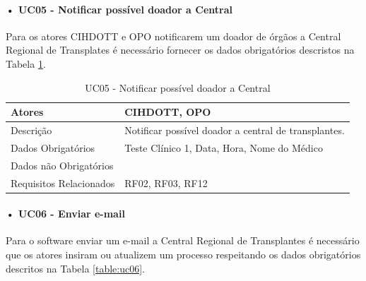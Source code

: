 \documentclass[portuguese,oneside]{tcc}
\begin{document}


\paragraph*{• UC05 - Notificar possível doador a Central}
Para os atores CIHDOTT e OPO notificarem um doador de órgãos a Central Regional de Transplates é necessário fornecer os dados obrigatórios descristos na Tabela \ref{table:uc05}. 

\begin{table}
\centering
\caption{UC05 - Notificar possível doador a Central} \label{table:uc05}
\begin{tabular}{ |p{5cm}|p{5cm}|  }

\hline
Atores & 
CIHDOTT, OPO\\

\hline
Descrição & 
 
Notificar possível doador a central de transplantes.
 \\

\hline
Dados Obrigatórios & 
Teste Clínico 1, Data, Hora, Nome do Médico
 \\

\hline
Dados não Obrigatórios & 
 \\

\hline
Requisitos Relacionados & 
RF02, RF03, RF12
 \\

\hline

\end{tabular}
\end{table}



\paragraph*{• UC06 - Enviar e-mail}
Para o software enviar um e-mail a Central Regional de Transplantes é necessário que os atores insiram ou atualizem um processo respeitando os dados obrigatórios descritos na Tabela \ref{table:uc06}. 
\end{document}
